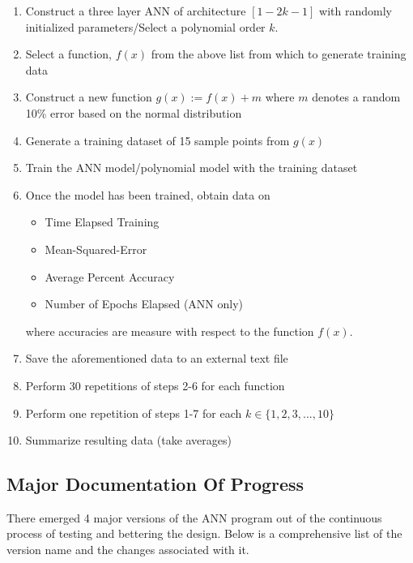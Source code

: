 \documentclass{article}
\begin{document}
\begin{enumerate}
    \item Construct a three layer ANN of architecture $[1-2k-1]$ with randomly initialized parameters/Select a polynomial order $k$.
    \item Select a function, $f(x)$ from the above list from which to generate training data
    \item Construct a new function $g(x) := f(x) + m$ where $m$ denotes a random 10\% error based on the normal distribution
    \item Generate a training dataset of 15 sample points from $g(x)$
    \item Train the ANN model/polynomial model with the training dataset
    \item Once the model has been trained, obtain data on 
    \begin{itemize}
        \item Time Elapsed Training
        \item Mean-Squared-Error
        \item Average Percent Accuracy
        \item Number of Epochs Elapsed (ANN only)
    \end{itemize}
    where accuracies are measure with respect to the function $f(x)$.
    \item Save the aforementioned data to an external text file
    \item Perform 30 repetitions of steps 2-6 for each function
    \item Perform one repetition of steps 1-7 for each $k \in \{1, 2, 3, ..., 10\}$
    \item Summarize resulting data (take averages)
\end{enumerate}
\subsection{Major Documentation Of Progress}

There emerged 4 major versions of the ANN program out of the continuous process of testing and bettering the design. Below is a comprehensive list of the version name and the changes associated with it.
\end{document}
